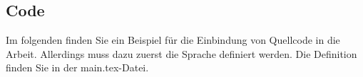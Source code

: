 \subsection{Code}

Im folgenden finden Sie ein Beispiel für die Einbindung von Quellcode in die Arbeit.
Allerdings muss dazu zuerst die Sprache definiert werden.
Die Definition finden Sie in der main.tex-Datei.

\begin{spacing}{1}
  
\end{spacing}
